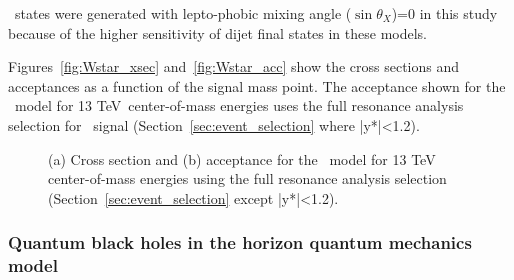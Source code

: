 \Wstar\ states were generated with lepto-phobic mixing angle ($\sin \theta_X$)=0 in this study because of the higher sensitivity of dijet final states in these models.


Figures~\ref{fig:Wstar_xsec} and~\ref{fig:Wstar_acc} show the cross sections and
acceptances as a function of the signal mass point.  
The acceptance shown for the \Wstar\ model for 13 TeV~center-of-mass energies 
uses the full resonance analysis selection for \Wstar\ signal (Section~\ref{sec:event_selection} where |y*|<1.2).

\begin{figure}[!htb]
  \centering
	\caption{(a) Cross section and (b) acceptance for the 
		\Wstar\ model for 13 TeV center-of-mass energies using the full resonance analysis selection (Section~\ref{sec:event_selection} except |y*|<1.2).
        }
\end{figure}


 \clearpage
 \subsubsection{Quantum black holes in the horizon quantum mechanics model}

